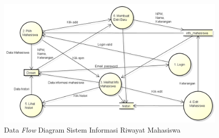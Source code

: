 \begin{enumerate}[(1)]
\begin{figure}[p]
\centering
\includegraphics[scale=0.5]{Gambar/dfdl1.png}
\caption[Data {\it Flow} Diagram Sistem Informasi Riwayat Mahasiswa]{Data {\it Flow}
Diagram Sistem Informasi Riwayat Mahasiswa}
\label{fig:dfdl1}
\end{figure}


\end{enumerate}
